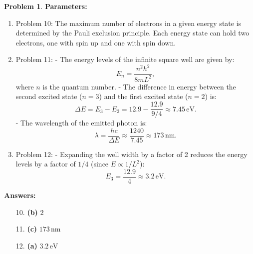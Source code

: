 \documentclass[12pt]{article}
\theoremstyle{definition} %
\newtheorem{problem}{Problem}
\theoremstyle{plain} %
\begin{document}
\begin{problem}
\textbf{Parameters:}
\begin{enumerate}
    \item Problem 10: The maximum number of electrons in a given energy state is determined by the Pauli exclusion principle. Each energy state can hold two electrons, one with spin up and one with spin down.
    \item Problem 11:
    - The energy levels of the infinite square well are given by:
    $$
    E_n = \frac{n^2 h^2}{8mL^2},
    $$
    where \(n\) is the quantum number.
    - The difference in energy between the second excited state (\(n = 3\)) and the first excited state (\(n = 2\)) is:
    $$
    \Delta E = E_3 - E_2 = 12.9 - \frac{12.9}{9/4} \approx 7.45 \, \text{eV}.
    $$
    - The wavelength of the emitted photon is:
    $$
    \lambda = \frac{hc}{\Delta E} \approx \frac{1240}{7.45} \approx 173 \, \text{nm}.
    $$
    \item Problem 12:
    - Expanding the well width by a factor of 2 reduces the energy levels by a factor of \(1/4\) (since \(E \propto 1/L^2\)):
    $$
    E_3 = \frac{12.9}{4} \approx 3.2 \, \text{eV}.
    $$
\end{enumerate}

\textbf{Answers:}
\begin{enumerate}
    \item[10.] \textbf{(b)} \(2\)
    \item[11.] \textbf{(c)} \(173 \, \text{nm}\)
    \item[12.] \textbf{(a)} \(3.2 \, \text{eV}\)
\end{enumerate}

\end{problem}
\end{document}
